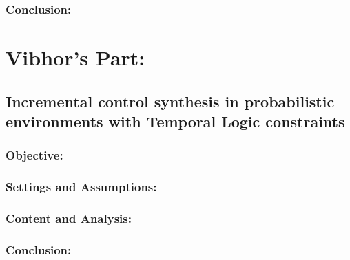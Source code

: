 \documentclass{article}
\theoremstyle{definition}
\begin{document}
\subsubsection{Conclusion:}


\section{Vibhor's Part:}
\subsection{ Incremental control synthesis in probabilistic environments with Temporal Logic constraints}
\subsubsection{Objective:}

\subsubsection{Settings and Assumptions:}

\subsubsection{Content and Analysis:}

\subsubsection{Conclusion:}



\end{document}
